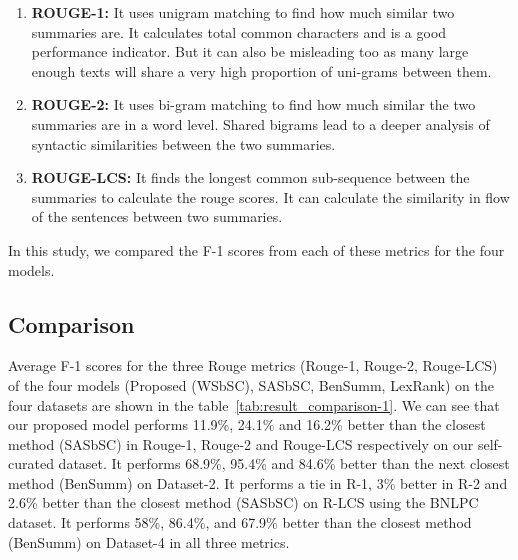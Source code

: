 \begin{enumerate}
    \item \textbf{ROUGE-1:} It uses unigram matching to find how much similar two summaries are. It calculates total common characters and is a good performance indicator. But it can also be misleading too as many large enough texts will share a very high proportion of uni-grams between them.
    \item \textbf{ROUGE-2:} It uses bi-gram matching to find how much similar the two summaries are in a word level. Shared bigrams lead to a deeper analysis of syntactic similarities between the two summaries.
    \item \textbf{ROUGE-LCS:} It finds the longest common sub-sequence between the summaries to calculate the rouge scores. It can calculate the similarity in flow of the sentences between two summaries.
\end{enumerate}

In this study, we compared the F-1 scores from each of these metrics for the four models.

\subsection{Comparison}\label{subsec:comparison}
Average F-1 scores for the three Rouge metrics (Rouge-1, Rouge-2, Rouge-LCS) of the four models (Proposed (WSbSC), SASbSC, BenSumm, LexRank) on the four datasets are shown in the table~\ref{tab:result_comparison-1}. We can see that our proposed model performs 11.9\%, 24.1\% and 16.2\% better than the closest method (SASbSC) in Rouge-1, Rouge-2 and Rouge-LCS respectively on our self-curated dataset. It performs 68.9\%, 95.4\% and 84.6\% better than the next closest method (BenSumm) on Dataset-2. It performs a tie in R-1, 3\% better in R-2 and 2.6\% better than the closest method (SASbSC) on R-LCS using the BNLPC dataset. It performs 58\%, 86.4\%, and 67.9\% better than the closest method (BenSumm) on Dataset-4 in all three metrics.\\

